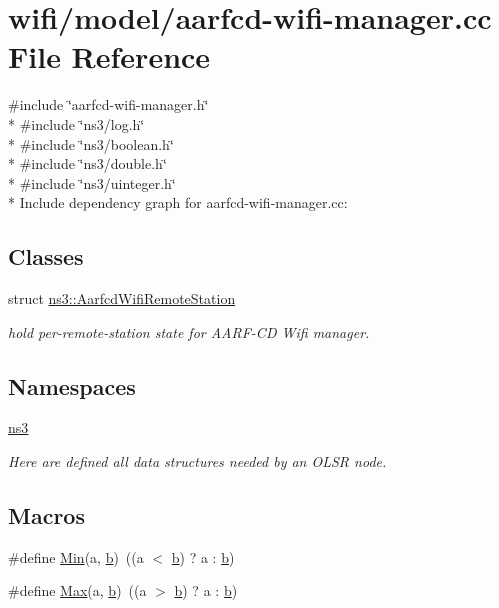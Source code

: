 \hypertarget{aarfcd-wifi-manager_8cc}{}\section{wifi/model/aarfcd-\/wifi-\/manager.cc File Reference}
\label{aarfcd-wifi-manager_8cc}
{\ttfamily \#include \char`\"{}aarfcd-\/wifi-\/manager.\+h\char`\"{}}\\*
{\ttfamily \#include \char`\"{}ns3/log.\+h\char`\"{}}\\*
{\ttfamily \#include \char`\"{}ns3/boolean.\+h\char`\"{}}\\*
{\ttfamily \#include \char`\"{}ns3/double.\+h\char`\"{}}\\*
{\ttfamily \#include \char`\"{}ns3/uinteger.\+h\char`\"{}}\\*
Include dependency graph for aarfcd-\/wifi-\/manager.cc\+:
\subsection*{Classes}
\begin{DoxyCompactItemize}
\item 
struct \hyperlink{structns3_1_1AarfcdWifiRemoteStation}{ns3\+::\+Aarfcd\+Wifi\+Remote\+Station}
\begin{DoxyCompactList}\small\item\em hold per-\/remote-\/station state for A\+A\+R\+F-\/\+CD Wifi manager. \end{DoxyCompactList}\end{DoxyCompactItemize}
\subsection*{Namespaces}
\begin{DoxyCompactItemize}
\item 
 \hyperlink{namespacens3}{ns3}
\begin{DoxyCompactList}\small\item\em Here are defined all data structures needed by an O\+L\+SR node. \end{DoxyCompactList}\end{DoxyCompactItemize}
\subsection*{Macros}
\begin{DoxyCompactItemize}
\item 
\#define \hyperlink{aarfcd-wifi-manager_8cc_a9e04209162ea72f9985338596262b657}{Min}(a,  \hyperlink{lte__pathloss_8m_a21ad0bd836b90d08f4cf640b4c298e7c}{b})~((a $<$ \hyperlink{lte__pathloss_8m_a21ad0bd836b90d08f4cf640b4c298e7c}{b}) ? a \+: \hyperlink{lte__pathloss_8m_a21ad0bd836b90d08f4cf640b4c298e7c}{b})
\item 
\#define \hyperlink{aarfcd-wifi-manager_8cc_a4886a8f966a69949cefc46a6a3468006}{Max}(a,  \hyperlink{lte__pathloss_8m_a21ad0bd836b90d08f4cf640b4c298e7c}{b})~((a $>$ \hyperlink{lte__pathloss_8m_a21ad0bd836b90d08f4cf640b4c298e7c}{b}) ? a \+: \hyperlink{lte__pathloss_8m_a21ad0bd836b90d08f4cf640b4c298e7c}{b})
\end{DoxyCompactItemize}
